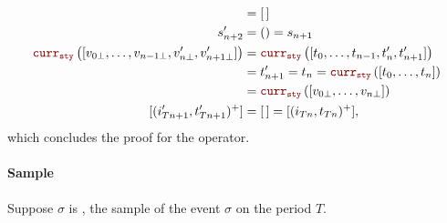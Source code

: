 \begin{skippableproof}
    \begin{align*}
        [(i'_{Tn}, t'_{Tn})^+]                                                   & = \emptylist                                           \\
        s'_{n+2}                                                                 & = () = s_{n+1}                                         \\
        \CurrVal{sty}{[v_{0\bot}, \dots, v_{n-1\bot}, v'_{n\bot}, v'_{n+1\bot}]} & = \CurrVal{sty}{[t_0, \dots, t_{n-1}, t'_n, t'_{n+1}]} \\
                                                                                 & = t'_{n+1} = t_n = \CurrVal{sty}{[t_0, \dots, t_n]}    \\
                                                                                 & = \CurrVal{sty}{[v_{0\bot}, \dots, v_{n\bot}]}         \\
        [(i'_{Tn+1}, t'_{Tn+1})^+]                                               & = \emptylist = [(i_{Tn}, t_{Tn})^+],
    \end{align*}
    which concludes the proof for the \timeop operator.

    \paragraph{Sample}
    Suppose $\sigma$ is , the sample of the event $\sigma$ on the period $T$.


\end{skippableproof}
